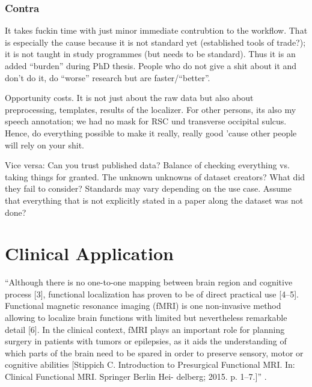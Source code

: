

\subsubsection{Contra}


%
It takes fuckin time with just minor immediate contrubtion to the workflow.
%
That is especially the cause because it is not standard yet (established tools
of trade?); it is not taught in study programmes (but needs to be standard).
Thus it is an added ``burden'' during PhD thesis.
%
People who do not give a shit about it and don't do it, do ``worse'' research
but are faster/``better''.

%
Opportunity costs. It is not just about the raw data but also about
preprocessing, templates, results of the localizer. For other persons, its also
my speech annotation; we had no mask for RSC und transverse occipital sulcus.
%
Hence, do everything possible to make it really, really good 'cause other people
will rely on your shit.

%
Vice versa: Can you trust published data? Balance of checking everything vs.
taking things for granted.
%
The unknown unknowns of dataset creators? What did they fail to consider?
Standards may vary depending on the use case. Assume that everything that is not
explicitly stated in a paper along the dataset was not done?


\section{Clinical Application}

``Although there is no one-to-one mapping between brain region and cognitive
process [3], functional localization has proven to be of direct practical use
[4–5]. Functional magnetic resonance imaging (fMRI) is one non-invasive method
allowing to localize brain functions with limited but nevertheless remarkable
detail [6]. In the clinical context, fMRI plays an important role for planning
surgery in patients with tumors or epilepsies, as it aids the understanding of
which parts of the brain need to be spared in order to preserve sensory, motor
or cognitive abilities [Stippich C. Introduction to Presurgical Functional
MRI. In: Clinical Functional MRI. Springer Berlin Hei- delberg; 2015. p. 1–7.]''
\citep{wegrzyn2018thought}.

